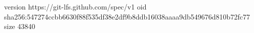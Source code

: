 version https://git-lfs.github.com/spec/v1
oid sha256:547274ccbb6630f88f535df38e2df9b8ddb16038aaaa9db549676d810b72fc77
size 43840
